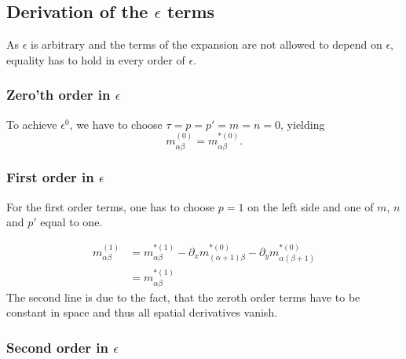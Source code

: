 \documentclass{article}
\begin{document}
\subsection{Derivation of the \texorpdfstring{$\epsilon$}{epsilon} terms}
\label{sub:Derivation of the epsilon terms}
As $\epsilon$ is arbitrary and the terms of the expansion are not allowed to depend on $\epsilon$, equality has to hold in every order of $\epsilon$.

\subsubsection{Zero'th order in \texorpdfstring{$\epsilon$}{epsilon}}
\label{subs:Zero'th order in epsilon}

To achieve $\epsilon^0$, we have to choose $\tau=p=p'=m=n=0$, yielding
\begin{equation}
  \label{eq:zeroth order in epsilon}
  m_{\alpha\beta}^{(0)} = m_{\alpha\beta}^{*(0)}.
\end{equation}


\subsubsection{First order in \texorpdfstring{$\epsilon$}{epsilon}}
\label{subs:First order in epsilon}

For the first order terms, one has to choose $p=1$ on the left side and one of $m$, $n$ and $p'$ equal to one.

\begin{equation}
  \label{eq:first order in epsilon}
  \begin{aligned}
  m_{\alpha\beta}^{(1)}
  & = m_{\alpha\beta}^{*(1)}
  - \partial_x m_{(\alpha+1)\beta}^{*(0)} - \partial_y m_{\alpha(\beta+1)}^{*(0)} \\
  & = m_{\alpha\beta}^{*(1)}
  \end{aligned}
\end{equation}
The second line is due to the fact, that the zeroth order terms have to be constant in space and thus all spatial derivatives vanish.

\subsubsection{Second order in \texorpdfstring{$\epsilon$}{epsilon}}
\label{subs:Second order in epsilon}
\end{document}
